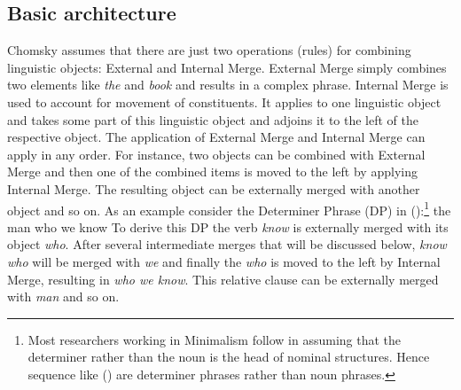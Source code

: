 \subsection{Basic architecture}

Chomsky assumes that there are just two operations (rules) for combining linguistic objects:
External and Internal Merge. External Merge simply combines two elements like \emph{the} and
\emph{book} and results in a complex phrase. Internal Merge is used to account for movement of
constituents. It applies to one linguistic object and takes some part of this linguistic object and
adjoins it to the left of the respective object. The application of External Merge and Internal
Merge can apply in any order. For instance, two objects can be combined with External Merge and then
one of the combined items is moved to the left by applying Internal Merge. The resulting object can
be externally merged with another object and so on. As an example consider the Determiner Phrase (DP) in
():\footnote{%
  Most researchers working in Minimalism follow \citet{Abney87a} in assuming that the determiner
  rather than the noun is the head of nominal structures. Hence sequence like () are
  determiner phrases rather than noun phrases.
}
\ea
the man who we know
\z
To derive this DP the verb \emph{know} is externally merged with its object \emph{who}. After
several intermediate merges that will be discussed below, \emph{know who} will be merged with
\emph{we} and finally the \emph{who} is moved to the left by Internal Merge, resulting in \emph{who
  we know}. This relative clause can be externally merged with \emph{man} and so on.

